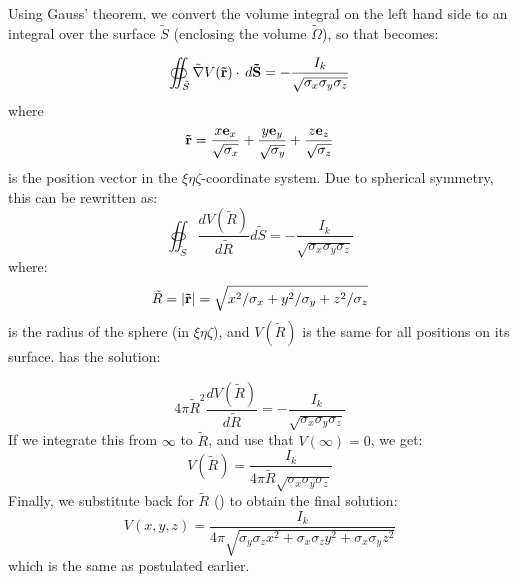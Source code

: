 Using Gauss' theorem, we convert the volume integral on the left hand side
to an integral over the surface $\tilde{S}$ (enclosing the volume $\tilde{\Omega}$), 
so that  becomes:

\begin{equation}
\oiint_{\tilde{S}} \tilde{\nabla}V({\bf \tilde{r}}) \cdot \, d{\bf \tilde{S}}  = - \frac{I_k}{\sqrt{\sigma_x\sigma_y\sigma_z}}
\label{eq:AppAniso:berit1}
\end{equation}
where 
\begin{equation}
{\bf \tilde{r}} = \frac{x{\bf e}_x}{\sqrt{\sigma_x}} + \frac{y{\bf e}_y}{\sqrt{\sigma_y}}+\frac{z{\bf e}_z}{\sqrt{\sigma_z}}
\end{equation}
is the position vector in the $\xi\eta\zeta$-coordinate system. Due to spherical symmetry, this can be rewritten as:
\begin{equation}
\oiint_{\tilde{S}} \frac{d V(\tilde{R})}{d\tilde{R}} d{\tilde{S}}  = - \frac{I_k}{\sqrt{\sigma_x\sigma_y\sigma_z}}
\label{eq:AppAniso:berit1ogenhalv}
\end{equation}
where:
\begin{equation}
\tilde{R} = |{\bf \tilde{r}}| = \sqrt{x^2/\sigma_x + y^2/\sigma_y + z^2/\sigma_z}
\label{eq:AppAniso:R}
\end{equation}
is the radius of the sphere (in $\xi\eta\zeta$), and $V(\tilde{R})$ is the same for all positions on its surface. 
 has the solution:

\begin{equation}
4\pi \tilde{R}^2 \frac{d V(\tilde{R})}{d\tilde{R}} = - \frac{I_k}{\sqrt{\sigma_x\sigma_y\sigma_z}}
\label{eq:AppAniso:berit2}
\end{equation}
If we integrate this from $\infty$ to $\tilde{R}$, and use that $V(\infty) = 0$, we get:
\begin{equation}
V(\tilde{R}) = \frac{I_k}{4\pi \tilde{R}\sqrt{\sigma_x\sigma_y\sigma_z}}
\label{eq:AppAniso:berit3}
\end{equation}
Finally, we substitute back for $\tilde{R}$ () to obtain the final solution: 
\begin{equation}
V(x,y,z) = \frac{I_k}{4 \pi \sqrt{\sigma_y\sigma_z x^2 + \sigma_x\sigma_z y^2 + \sigma_x\sigma_y z^2}}
\label{eq:VC:berit3}
\end{equation}
which is the same as  postulated earlier. 
